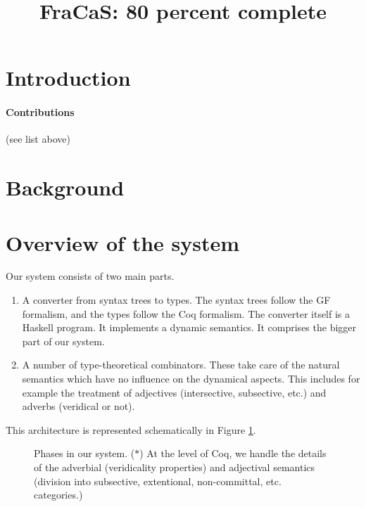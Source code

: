 \documentclass{article}
\title{FraCaS: 80 percent complete}
\begin{document}
\section{Introduction}

\paragraph{Contributions}
(see list above)
\section{Background}

\section{Overview of the system}

Our system consists of two main parts.
\begin{enumerate}
\item A converter from syntax trees to types. The syntax trees follow
  the GF formalism, and the types follow the Coq formalism. The
  converter itself is a Haskell program. It implements a dynamic
  semantics. It comprises the bigger part of our system.
\item A number of type-theoretical combinators. These take care of the
  natural semantics which have no influence on the dynamical
  aspects. This includes for example the treatment of adjectives
  (intersective, subsective, etc.) and adverbs (veridical or not).
\end{enumerate}
This architecture is represented schematically in Figure \ref{fig:overview}.

\begin{figure}
  \centering
{
  \tiny
{}
}
\caption{Phases in our system. ($\ast$) At the level of Coq, we handle
  the details of the adverbial (veridicality properties) and
  adjectival semantics (division into subsective, extentional,
  non-committal, etc. categories.) }
  \label{fig:overview}
\end{figure}
\end{document}
